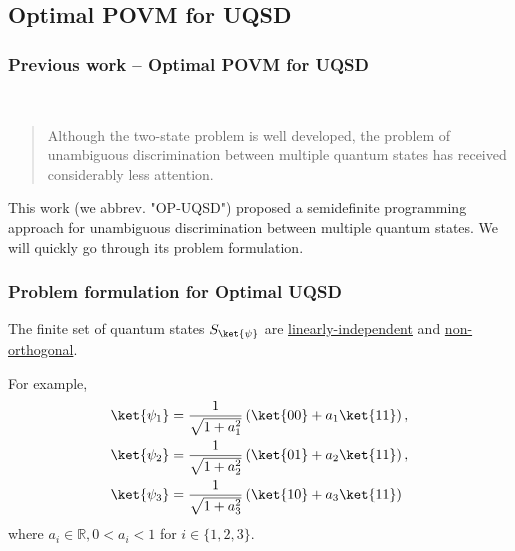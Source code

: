 \documentclass{beamer}
\begin{document}
\subsection{Optimal POVM for UQSD}
\begin{frame}
    \frametitle{Previous work -- Optimal POVM for UQSD}
    \cite{RN23}\\
    \begin{quote}
        Although the two-state problem is well developed, the
        problem of unambiguous discrimination between multiple
        quantum states has received considerably less attention.
    \end{quote}
    This work (we abbrev. "OP-UQSD") proposed a semidefinite programming
    approach for unambiguous discrimination between multiple quantum states.
    We will quickly go through its problem formulation.
\end{frame}

\begin{frame}
    \frametitle{Problem formulation for Optimal UQSD}
    The finite set of quantum states $S_{\ket{\psi}}$ are
    \underline{linearly-independent} and \underline{non-orthogonal}.
    \vspace*{0.1cm}

    For example,
    \begin{align}
        \ket{\psi_1} & = \frac{1}{\sqrt{1 + a_{1}^{2}}} \left( \ket{00} + a_{1} \ket{11} \right) , \\
        \ket{\psi_2} & = \frac{1}{\sqrt{1 + a_{2}^{2}}} \left( \ket{01} + a_{2} \ket{11} \right) , \\
        \ket{\psi_3} & = \frac{1}{\sqrt{1 + a_{3}^{2}}} \left( \ket{10} + a_{3} \ket{11} \right)
    \end{align}
    where $a_{i} \in \mathbb{R}, 0 < a_{i} < 1$ for $i \in \{1, 2, 3\}$.
\end{frame}
\end{document}
